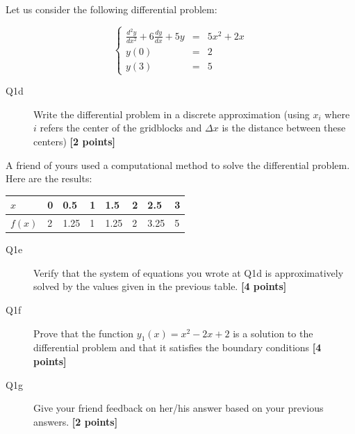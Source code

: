 \documentclass{article}
\begin{document}
Let us consider the following differential problem:

\begin{equation}
\left\lbrace
\begin{array}{lll}
\displaystyle{\frac{d^2y}{dx^2}} +6  \displaystyle{\frac{dy}{dx}} + 5y &=& 5x^2 + 2x \\
y(0) &=& 2 \\
y(3) & = & 5
\end{array}
\right. \label{eq:diffprob}
\end{equation}

\begin{description}
\item [Q1d] Write the differential problem in a discrete approximation (using $x_i$ where $i$ refers the center of the gridblocks and $\Delta x$ is the distance between these centers) \textbf{[2 points]}
\vspace{4.5cm}

\end{description}

A friend of yours used a computational method to solve the differential problem. Here are the results: 
\begin{center}
\begin{tabular}{|l|lllllll|}
\hline
$x$ & 0 & 0.5 &  1 & 1.5 & 2 & 2.5 & 3 \\ \hline
$f(x)$ & 2  &  1.25  &  1  &  1.25 &   2 &    3.25 &    5  \\ 
\hline
\end{tabular}
\end{center}

\begin{description}

\item [Q1e] Verify that the system of equations you wrote at Q1d is approximatively solved by the values given in the previous table. \textbf{[4 points]}
\vspace{5cm}


\item [Q1f] Prove that the function $y_1(x) = x^2-2x+2$ is a solution to the differential problem and that it satisfies the boundary conditions \textbf{[4 points]}
\vspace{3cm}

\item [Q1g] Give your friend feedback on her/his answer based on your previous answers.  \textbf{[2 points]}
\vspace{3cm}


\end{description}
\end{document}
